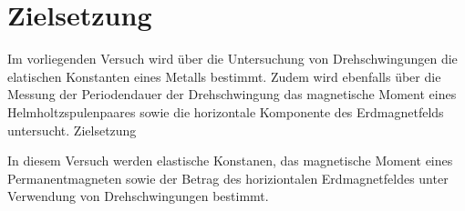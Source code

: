 \section{Zielsetzung}
\label{sec:Zielsetzung}
Im vorliegenden Versuch wird über die Untersuchung von Drehschwingungen die elatischen Konstanten eines Metalls bestimmt.
Zudem wird ebenfalls über die Messung der Periodendauer der Drehschwingung das magnetische Moment eines Helmholtzspulenpaares sowie die horizontale Komponente des Erdmagnetfelds untersucht.
Zielsetzung

In diesem Versuch werden elastische Konstanen, das magnetische Moment eines Permanentmagneten 
sowie der Betrag des horiziontalen Erdmagnetfeldes unter Verwendung von Drehschwingungen 
bestimmt.

